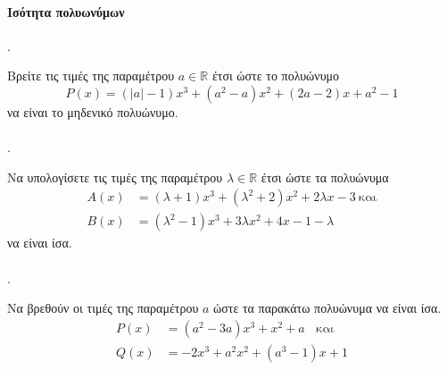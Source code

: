 \documentclass[11pt,a4paper,twocolumn]{article}
\newcounter{askhsh}
\newcommand{\askhsh}{\large\theaskhsh.\ \addtocounter{askhsh}{1}}
\begin{document}
\paragraph{Ισότητα πολυωνύμων}
\askhsh Βρείτε τις τιμές της παραμέτρου $a\in\mathbb{R}$ έτσι ώστε το πολυώνυμο
\[ P(x)=(|a|-1)x^3+(a^2-a)x^2+(2a-2)x+a^2-1 \]
να είναι το μηδενικό πολυώνυμο.\\\\
\askhsh Να υπολογίσετε τις τιμές της παραμέτρου $\lambda\in\mathbb{R}$ έτσι ώστε τα πολυώνυμα
\begin{align*}
A(x)&=(\lambda+1)x^3+(\lambda^2+2)x^2+2\lambda x-3\ \text{και}\\
B(x)&=\left(\lambda^2-1\right)x^3+3\lambda x^2 +4x-1-\lambda
\end{align*}
να είναι ίσα.\\\\
\askhsh Να βρεθούν οι τιμές της παραμέτρου $ a $ ώστε τα παρακάτω πολυώνυμα να είναι ίσα.
\begin{align*}
P(x)&=(a^2-3a)x^3+x^2+a
\;\;\textrm{ και }\\Q(x)&=-2x^3+a^2x^2+(a^3-1) x + 1
\end{align*}
\end{document}
